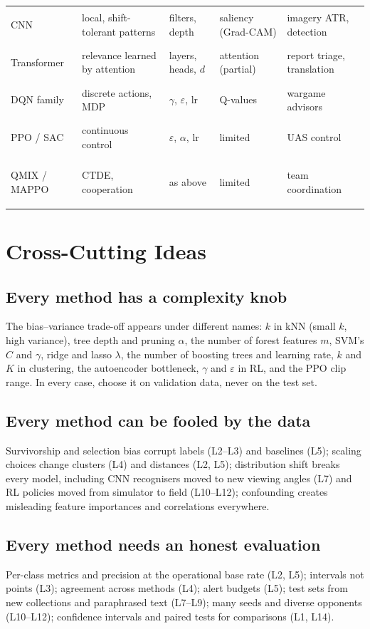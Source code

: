 \documentclass[11pt]{article}
\begin{document}
\begin{center}
\begin{tabularx}{\textwidth}{>{\bfseries\raggedright\arraybackslash}p{2.5cm}p{2.6cm}p{2.3cm}>{\raggedright\arraybackslash}p{1.9cm}X}
CNN & local, shift-tolerant patterns & filters, depth & saliency (Grad-CAM) & imagery ATR, detection\\
Transformer & relevance learned by attention & layers, heads, $d$ & attention (partial) & report triage, translation\\
DQN family & discrete actions, MDP & $\gamma$, $\varepsilon$, lr & Q-values & wargame advisors\\
PPO / SAC & continuous control & $\varepsilon$, $\alpha$, lr & limited & UAS control\\
QMIX / MAPPO & CTDE, cooperation & as above & limited & team coordination\\\bottomrule
\end{tabularx}\end{center}

\section{Cross-Cutting Ideas}
\subsection{Every method has a complexity knob}
The bias--variance trade-off appears under different names: $k$ in kNN (small $k$, high variance), tree depth and pruning $\alpha$, the number of forest features $m$, SVM's $C$ and $\gamma$, ridge and lasso $\lambda$, the number of boosting trees and learning rate, $k$ and $K$ in clustering, the autoencoder bottleneck, $\gamma$ and $\varepsilon$ in RL, and the PPO clip range. In every case, choose it on validation data, never on the test set.
\subsection{Every method can be fooled by the data}
Survivorship and selection bias corrupt labels (L2--L3) and baselines (L5); scaling choices change clusters (L4) and distances (L2, L5); distribution shift breaks every model, including CNN recognisers moved to new viewing angles (L7) and RL policies moved from simulator to field (L10--L12); confounding creates misleading feature importances and correlations everywhere.
\subsection{Every method needs an honest evaluation}
Per-class metrics and precision at the operational base rate (L2, L5); intervals not points (L3); agreement across methods (L4); alert budgets (L5); test sets from new collections and paraphrased text (L7--L9); many seeds and diverse opponents (L10--L12); confidence intervals and paired tests for comparisons (L1, L14).
\end{document}
